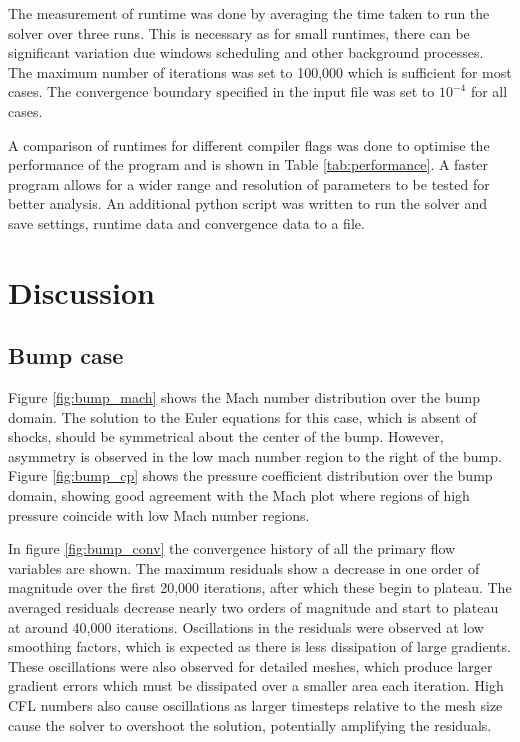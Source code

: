 \documentclass{article}
\begin{document}
The measurement of runtime was done by averaging the time taken to run the solver over three runs.
This is necessary as for small runtimes, there can be significant variation due windows scheduling and other background processes.
The maximum number of iterations was set to 100,000 which is sufficient for most cases.
The convergence boundary specified in the input file was set to $10^{-4}$ for all cases.

A comparison of runtimes for different compiler flags was done to optimise the performance of the program and is shown in Table \ref{tab:performance}.
A faster program allows for a wider range and resolution of parameters to be tested for better analysis.
An additional python script was written to run the solver and save settings, runtime data and convergence data to a file.


\section{Discussion}




\subsection{Bump case}

Figure \ref{fig:bump_mach} shows the Mach number distribution over the bump domain.
The solution to the Euler equations for this case, which is absent of shocks, should be symmetrical about the center of the bump.
However, asymmetry is observed in the low mach number region to the right of the bump.
Figure \ref{fig:bump_cp} shows the pressure coefficient distribution over the bump domain, showing good agreement with
the Mach plot where regions of high pressure coincide with low Mach number regions.

In figure \ref{fig:bump_conv} the convergence history of all the primary flow variables are shown.
The maximum residuals show a decrease in one order of magnitude over the first 20,000 iterations, after which these begin to plateau.
The averaged residuals decrease nearly two orders of magnitude and start to plateau at around 40,000 iterations.
Oscillations in the residuals were observed at low smoothing factors, which is expected as there is less dissipation of large gradients.
These oscillations were also observed for detailed meshes, which produce larger gradient errors which must be dissipated over a smaller area each iteration.
High CFL numbers also cause oscillations as larger timesteps relative to the mesh size cause the solver to overshoot the solution, potentially amplifying the residuals.
\end{document}
